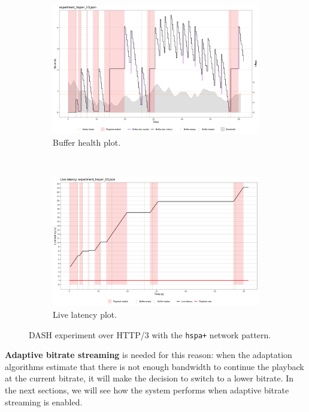 \begin{figure}[h]
	\centering
	
	\begin{subfigure}[t]{0.45\textwidth}
		\centering
		\includegraphics[width=\textwidth]{res/eval_nonabr_hspa+_h3.png}
		\caption{Buffer health plot.}
		\label{fig:eval_nonabr_hspa+_h3_buffer}
	\end{subfigure}%
	~ 
	\begin{subfigure}[t]{0.45\textwidth}
		\centering
		\includegraphics[width=\textwidth]{res/eval_nonabr_hspa+_h3_latency.png}
		\caption{Live latency plot.}
		\label{fig:eval_nonabr_hspa+_h3_waterfall}
	\end{subfigure}
	
	\caption{DASH experiment over HTTP/3 with the \texttt{hspa+} network pattern.}
	\label{fig:eval_nonabr_hspa+_h3}
\end{figure}

\textbf{Adaptive bitrate streaming} is needed for this reason: when the adaptation algorithms estimate that there is not enough bandwidth to continue the playback at the current bitrate, it will make the decision to switch to a lower bitrate. In the next sections, we will see how the system performs when adaptive bitrate streaming is enabled.

